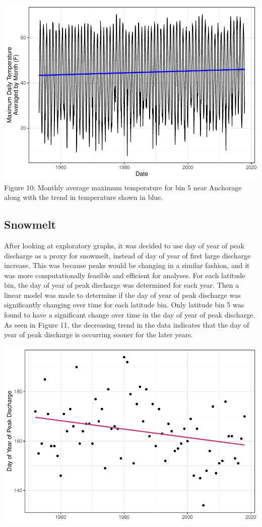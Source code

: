 \documentclass[12pt,]{article}
\begin{document}
\includegraphics{Project_Report_v2_files/figure-latex/Temperature Analysis-1.pdf}
Figure 10: Monthly average maximum temperature for bin 5 near Anchorage
along with the trend in temperature shown in blue.

\hypertarget{snowmelt-1}{%
\subsection{Snowmelt}\label{snowmelt-1}}

After looking at exploratory graphs, it was decided to use day of year
of peak discharge as a proxy for snowmelt, instead of day of year of
first large discharge increase. This was because peaks would be changing
in a similar fashion, and it was more computationally feasible and
efficient for analyses. For each latitude bin, the day of year of peak
discharge was determined for each year. Then a linear model was made to
determine if the day of year of peak discharge was significantly
changing over time for each latitude bin. Only latitude bin 5 was found
to have a significant change over time in the day of year of peak
discharge. As seen in Figure 11, the decreasing trend in the data
indicates that the day of year of peak discharge is occurring sooner for
the later years.

\includegraphics{Project_Report_v2_files/figure-latex/Snowmelt Analysis figure-1.pdf}
\end{document}
